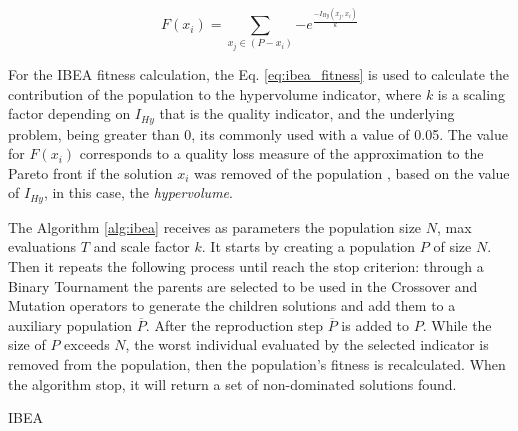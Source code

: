 \begin{equation} \label{eq:ibea_fitness}
	F(x_i) = \sum_{x_j \in (P-x_i)} {-e^\frac{-I_{Hy}(x_j,x_i)}{k}}
\end{equation}


For the IBEA fitness calculation, the Eq. \ref{eq:ibea_fitness} is used to calculate the contribution of the population to the hypervolume indicator, where $k$ is a scaling factor depending on $I_{Hy}$ that is the quality indicator, and the underlying problem, being greater than 0, its commonly used with a value of 0.05. The value for $F(x_i)$ corresponds to a quality loss measure of the approximation to the Pareto front if the solution $x_i$ was removed of the population \cite{figueiredo2013algoritmo}, based on the value of $I_{Hy}$, in this case, the \textit{hypervolume}.


The Algorithm \ref{alg:ibea} receives as parameters the population size $N$, max evaluations $T$ and scale factor $k$. It starts by creating a population $P$ of size $N$. Then it repeats the following process until reach the stop criterion: through a Binary Tournament the parents are selected to be used in the Crossover and Mutation operators to generate the children solutions and add them to a auxiliary population $\overline P$. After the reproduction step $\overline P$ is added to $P$. While the size of $P$ exceeds $N$, the worst individual evaluated by the selected indicator is removed from the population, then the population's fitness is recalculated. When the algorithm stop, it will return a set of non-dominated solutions found.

\begin{algorithm}[htb!]
	\begin{algorithmic}[1]
	
	
		
		
		\EndWhile
	
	\EndWhile
	
	\end{algorithmic}
	\caption{IBEA}
	\label{alg:ibea}
\end{algorithm}


